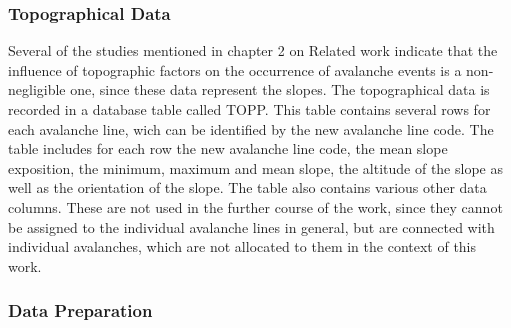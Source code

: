 \documentclass[../masterarbeit.tex]{subfiles}
\begin{document}
\subsubsection{Topographical Data}
Several of the studies mentioned in chapter 2 on Related work indicate that the influence of topographic factors on the occurrence of avalanche events is a non-negligible one, since these data represent the slopes.\autocite[]{Tiwari:2021} \autocite[]{Bahram:2019} 
The topographical data is recorded in a database table called TOPP. This table contains several rows for each avalanche line, wich can be identified by the new avalanche line code. The table includes for each row the new avalanche line code, the mean slope exposition, the minimum, maximum and mean slope, the altitude of the slope as well as the orientation of the slope. The table also contains various other data columns. These are not used in the further course of the work, since they cannot be assigned to the individual avalanche lines in general, but are connected with individual avalanches, which are not allocated to them in the context of this work. 




\subsubsection{Data Preparation}
 
\end{document}
